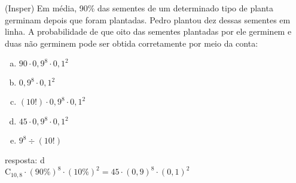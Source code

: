 \begin{ex}
(Insper) Em média, 90\% das sementes de um determinado tipo de planta germinam depois que foram plantadas. Pedro plantou dez dessas sementes em linha. A probabilidade de que oito das sementes plantadas por ele germinem e duas não germinem pode ser obtida corretamente por meio da conta: 
    \begin{enumerate}[(a)]
    \item $90\cdot0,9^8\cdot0,1^2$
    \item $0,9^8\cdot0,1^2$
    \item $(10!)\cdot0,9^8\cdot0,1^2$
    \item $45\cdot0,9^8\cdot0,1^2$
    \item $9^8\div(10!)$
    \end{enumerate}
      \begin{sol}
        resposta: d \\
      $\mathrm{C}_{{10},8}\cdot(90\%)^8\cdot(10\%)^2=45\cdot(0,9)^8\cdot(0,1)^2$
        
        
      \end{sol}
\end{ex}